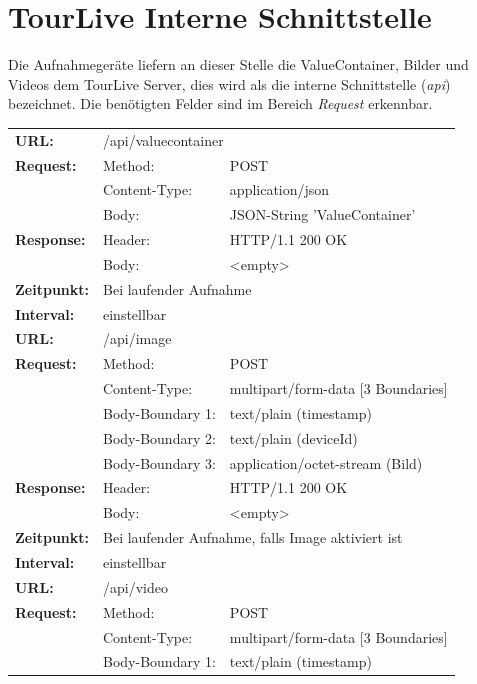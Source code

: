 \section{TourLive Interne Schnittstelle}
\label{sec:tourliveserverapi}
Die Aufnahmegeräte liefern an dieser Stelle die ValueContainer, Bilder und Videos dem TourLive Server, dies wird als die interne Schnittstelle (\textit{\gls{api}}) bezeichnet. Die benötigten Felder sind im Bereich \textit{Request} erkennbar.
{\renewcommand{\arraystretch}{1}
    \begin{longtable}{ p{2.5cm} p{3.5cm} p{6cm}}
	\textbf{URL:} & \multicolumn{2}{p{10cm}}{/api/valuecontainer} \\
	\textbf{Request:} & Method: & POST \\
		& Content-Type: & application/json \\
		& Body: & JSON-String 'ValueContainer'\\
	\textbf{Response:} & Header: & HTTP/1.1 200 OK \\
		& Body: & <empty> \\
	\textbf{Zeitpunkt:} & \multicolumn{2}{p{10cm}}{Bei laufender Aufnahme} \\ 
	\textbf{Interval:} & \multicolumn{2}{p{10cm}}{einstellbar} \\
\hline
\hline
	\textbf{URL:} & \multicolumn{2}{p{10cm}}{/api/image} \\
	\textbf{Request:} & Method: & POST \\
		& Content-Type: & multipart/form-data [3 Boundaries] \\
		& Body-Boundary 1: & text/plain (timestamp) \\
		& Body-Boundary 2: & text/plain (deviceId) \\
		& Body-Boundary 3: & application/octet-stream (Bild) \\
	\textbf{Response:} & Header: & HTTP/1.1 200 OK \\
		& Body: & <empty> \\
	\textbf{Zeitpunkt:} & \multicolumn{2}{p{10cm}}{Bei laufender Aufnahme, falls Image aktiviert ist} \\ 
	\textbf{Interval:} & \multicolumn{2}{p{10cm}}{einstellbar} \\
\hline
\hline
	\textbf{URL:} & \multicolumn{2}{p{10cm}}{/api/video} \\
	\textbf{Request:} & Method: & POST \\
		& Content-Type: & multipart/form-data [3 Boundaries] \\
		& Body-Boundary 1: & text/plain (timestamp) \\

\end{longtable}}

